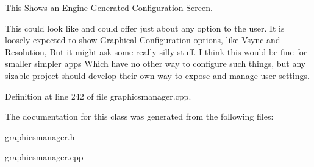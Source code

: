 This Shows an Engine Generated Configuration Screen. 

This could look like and could offer just about any option to the user. It is loosely expected to show Graphical Configuration options, like Vsync and Resolution, But it might ask some really silly stuff. I think this would be fine for smaller simpler apps Which have no other way to configure such things, but any sizable project should develop their own way to expose and manage user settings. 

Definition at line 242 of file graphicsmanager.cpp.



The documentation for this class was generated from the following files:\begin{DoxyCompactItemize}
\item 
graphicsmanager.h\item 
graphicsmanager.cpp\end{DoxyCompactItemize}
